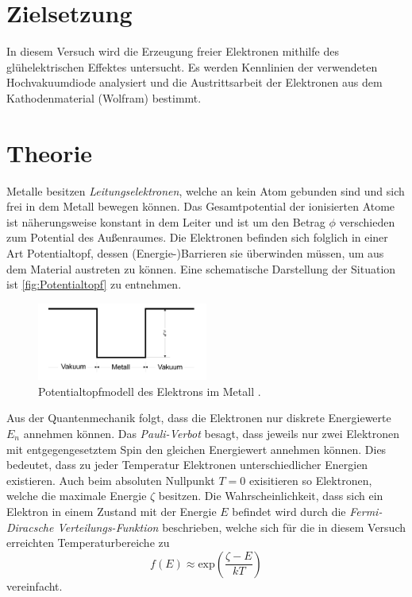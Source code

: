 \section{Zielsetzung}
In diesem Versuch wird die Erzeugung freier Elektronen mithilfe des glühelektrischen Effektes untersucht. Es werden Kennlinien der verwendeten Hochvakuumdiode 
analysiert und die Austrittsarbeit der Elektronen aus dem Kathodenmaterial (Wolfram) bestimmt.

\section{Theorie}
\label{sec:Theorie}
Metalle besitzen \textit{Leitungselektronen}, welche an kein Atom gebunden sind und sich frei in dem Metall bewegen können. Das Gesamtpotential der ionisierten Atome
ist näherungsweise konstant in dem Leiter und ist um den Betrag $\phi$ verschieden zum Potential des Außenraumes. Die Elektronen befinden sich folglich in einer Art 
Potentialtopf, dessen (Energie-)Barrieren sie überwinden müssen, um aus dem Material austreten zu können. Eine schematische Darstellung der Situation ist \autoref{fig:Potentialtopf}
zu entnehmen.

\begin{figure}
    \centering
    \includegraphics[width = 0.5\textwidth]{content/Potentialtopf.png}
    \caption{Potentialtopfmodell des Elektrons im Metall \cite{v504}.}
    \label{fig:Potentialtopf}
\end{figure}

Aus der Quantenmechanik folgt, dass die Elektronen nur diskrete Energiewerte $E_n$ annehmen können. Das \textit{Pauli-Verbot} besagt, dass jeweils nur zwei Elektronen 
mit entgegengesetztem Spin den gleichen Energiewert annehmen können. Dies bedeutet, dass zu jeder Temperatur Elektronen unterschiedlicher Energien existieren. 
Auch beim absoluten Nullpunkt $T = 0$ exisitieren so Elektronen, welche die maximale Energie $\zeta$ besitzen. Die Wahrscheinlichkeit, dass sich ein Elektron 
in einem Zustand mit der Energie $E$ befindet wird durch die \textit{Fermi-Diracsche Verteilungs-Funktion} beschrieben, welche sich für die in diesem Versuch erreichten 
Temperaturbereiche zu 
\begin{equation}
    \label{eqn:Fermi_Dirac}
    f(E) \approx \mathrm{exp}\left( \frac{\zeta - E}{kT} \right)
\end{equation}
vereinfacht.

